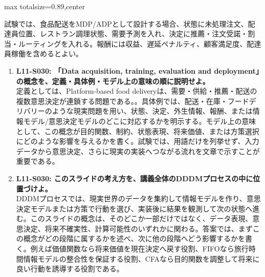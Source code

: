 \begin{minipage}[t]{0.58\textwidth}
\begin{adjustbox}{max totalsize={\textwidth}{0.89\textheight},center}
\begin{minipage}{\textwidth}
試験では、食品配送をMDP/ADPとして設計する場合、状態に未処理注文、配達員位置、レストラン調理状態、需要予測を入れ、決定に推薦・注文受諾・割当・ルーティングを入れる。報酬には収益、遅延ペナルティ、顧客満足度、配達員稼働を含めるとよい。\par{}\begin{enumerate}\item \textbf{L11-S030: 「Data acquisition, training, evaluation and deployment」の概念を、定義・具体例・モデル上の意味の順に説明せよ。}\\定義としては、Platform-based food deliveryは、需要・供給・推薦・配送の複数意思決定が連鎖する問題である。。具体例では、配送・在庫・フードデリバリーのような現実問題を用い、状態、決定、外生情報、報酬、または情報モデル/意思決定モデルのどこに対応するかを明示する。モデル上の意味として、この概念が目的関数、制約、状態表現、将来価値、または方策選択にどのような影響を与えるかを書く。試験では、用語だけを列挙せず、入力データから意思決定、さらに現実の実装へつながる流れを文章で示すことが重要である。\item \textbf{L11-S030: このスライドの考え方を、講義全体のDDDMプロセスの中に位置づけよ。}\\DDDMプロセスでは、現実世界のデータを集約して情報モデルを作り、意思決定モデルまたは方策で行動を選び、実装後に結果を観測して次の状態へ進む。このスライドの概念は、そのどこか一部だけではなく、データ表現、意思決定、将来不確実性、計算可能性のいずれかに関わる。答案では、まずこの概念がどの段階に属するかを述べ、次に他の段階へどう影響するかを書く。例えば価値関数なら将来価値を現在決定へ戻す役割、FIFOなら旅行時間情報モデルの整合性を保証する役割、CFAなら目的関数を調整して将来に良い行動を誘導する役割である。\end{enumerate}
\end{minipage}
\end{adjustbox}
\end{minipage}


